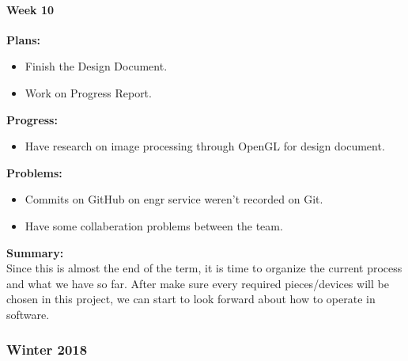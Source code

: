 \paragraph{Week 10}
\begin{adjustwidth}{2.5em}{0pt} 
    \vspace{-0.5cm}\textbf{Plans:}
    \vspace{-0.5cm}
    \begin{itemize}
        \item Finish the Design Document.
        \item Work on Progress Report.
    \end{itemize} 
    \vspace{-0.3cm}\textbf{Progress:}
    \vspace{-0.5cm}
    \begin{itemize}
        \item Have research on image processing through OpenGL for design document.
    \end{itemize} 
    \vspace{-0.3cm}\textbf{Problems:}
    \vspace{-0.5cm}
    \begin{itemize}
        \item Commits on GitHub on engr service weren't recorded on Git.
        \item Have some collaberation problems between the team.
    \end{itemize} 
    \vspace{-0.3cm}\noindent\textbf{Summary:}\\
    \noindent Since this is almost the end of the term, it is time to organize the current process and 
    what we have so far. After make sure every required pieces/devices will be chosen in this project, 
    we can start to look forward about how to operate in software. \\
\end{adjustwidth} 

\subsubsection{Winter 2018}

